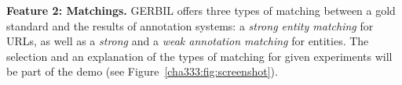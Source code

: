 

\textbf{Feature 2: Matchings.}
GERBIL offers three types of matching between a gold standard and the results of annotation systems: a \emph{strong entity matching} for URLs, as well as a  \emph{strong} and a \emph{weak annotation matching} for entities.
The selection and an explanation of the types of matching for given experiments will be part of the demo (see Figure~\ref{cha333:fig:screenshot}). %

